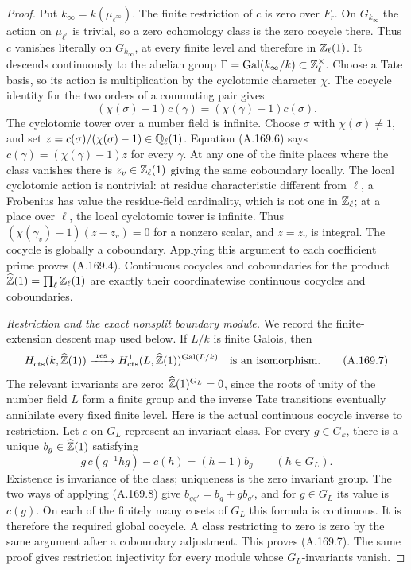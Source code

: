 \begin{proof}
Put \(k_\infty=k(\mu_{\ell^\infty})\).
The finite restriction of \(c\) is zero over \(F_r\).
On \(G_{k_\infty}\) the action on \(\mu_{\ell^r}\) is trivial,
so a zero cohomology class is the zero cocycle there.  Thus \(c\)
vanishes literally on \(G_{k_\infty}\), at every finite level and
therefore in \(\mathbb Z_\ell(1)\).  It descends continuously to the
abelian group
\(\Gamma=\operatorname{Gal}(k_\infty/k)\subset\mathbb Z_\ell^\times\).
Choose a Tate basis, so its action is multiplication by the
cyclotomic character \(\chi\).  The cocycle identity for the two
orders of a commuting pair gives
\[
    (\chi(\sigma)-1)c(\gamma)
                  =(\chi(\gamma)-1)c(\sigma).
\tag{A.169.6}
\]
The cyclotomic tower over a number field is infinite.  Choose
\(\sigma\) with \(\chi(\sigma)\ne1\), and set
\(z=c(\sigma)/(\chi(\sigma)-1)\in\mathbb Q_\ell(1)\).
Equation (A.169.6) says
\(c(\gamma)=(\chi(\gamma)-1)z\) for every \(\gamma\).
At any one of the finite places where the class vanishes there is
\(z_v\in\mathbb Z_\ell(1)\) giving the same coboundary locally.
The local cyclotomic action is nontrivial: at residue characteristic
different from \(\ell\), a Frobenius has value the residue-field
cardinality, which is not one in \(\mathbb Z_\ell\); at a place over
\(\ell\), the local cyclotomic tower is infinite.  Thus
\((\chi(\gamma_v)-1)(z-z_v)=0\) for a nonzero scalar, and
\(z=z_v\) is integral.  The cocycle is globally a coboundary.
Applying this argument to each coefficient prime proves (A.169.4).
Continuous cocycles and coboundaries for the product
\(\widehat{\mathbb Z}(1)=\prod_\ell\mathbb Z_\ell(1)\) are exactly their
coordinatewise continuous cocycles and coboundaries.

\emph{Restriction and the exact nonsplit boundary module.}
We record the finite-extension descent map used below.  If \(L/k\)
is finite Galois, then
\[
 H^1_{\rm cts}(k,\widehat{\mathbb Z}(1))
       \xrightarrow{\ \operatorname{res}\ }
 H^1_{\rm cts}(L,\widehat{\mathbb Z}(1))^{\operatorname{Gal}(L/k)}
                         \quad\text{is an isomorphism}.
\tag{A.169.7}
\]
The relevant invariants are zero:
\(\widehat{\mathbb Z}(1)^{G_L}=0\), since the roots of unity of the
number field \(L\) form a finite group and the inverse Tate
transitions eventually annihilate every fixed finite level.
Here is the actual continuous cocycle inverse to restriction.
Let \(c\) on \(G_L\) represent an invariant class.  For every
\(g\in G_k\), there is a unique \(b_g\in\widehat{\mathbb Z}(1)\)
satisfying
\[
 g\,c(g^{-1}hg)-c(h)=(h-1)b_g\qquad(h\in G_L).
\tag{A.169.8}
\]
Existence is invariance of the class; uniqueness is the zero
invariant group.  The two ways of applying (A.169.8) give
\(b_{gg'}=b_g+g b_{g'}\), and for \(g\in G_L\) its value
is \(c(g)\).  On each of the finitely many cosets of \(G_L\)
this formula is continuous.  It is therefore the required global
cocycle.  A class restricting to zero is zero by the same argument
after a coboundary adjustment.  This proves (A.169.7).  The same
proof gives restriction injectivity for every module whose
\(G_L\)-invariants vanish.


\end{proof}
